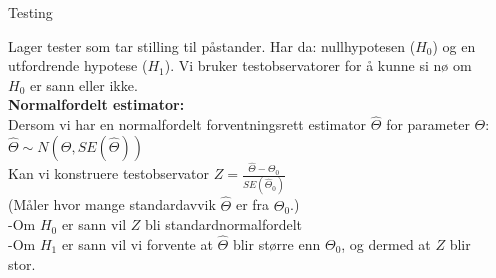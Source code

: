 \documentclass[final,hyperref={pdfpagelabels=false}]{beamer}
\begin{document}
\begin{frame}{}
\begin{columns}[t]
\begin{column}{.25\linewidth}
		\end{column}
		\begin{column}{.25\linewidth}
			\begin{block}{\center\normalsize Testing}
				{\footnotesize\raggedright
					Lager tester som tar stilling til påstander. Har da: nullhypotesen ($H_0$) og en utfordrende hypotese ($H_1$). Vi bruker testobservatorer for å kunne si nø om $H_0$ er sann eller ikke.\\
					\textbf{Normalfordelt estimator:}\\
					Dersom vi har en normalfordelt forventningsrett estimator $\hat\Theta$ for parameter $\Theta$: $\hat\Theta\sim N(\Theta,SE(\hat\Theta))$\\
					Kan vi konstruere testobservator $Z=\frac{\hat\Theta-\Theta_0}{SE(\hat\Theta_0)}$\\
					(Måler hvor mange standardavvik $\hat\Theta$ er fra $\Theta_0$.)\\
					-Om $H_0$ er sann vil $Z$ bli standardnormalfordelt\\
					-Om $H_1$ er sann vil vi forvente at $\hat\Theta$ blir større enn $\Theta_0$, og dermed at $Z$ blir stor.\\
}
\end{block}
\end{column}
\end{columns}
\end{frame}
\end{document}
